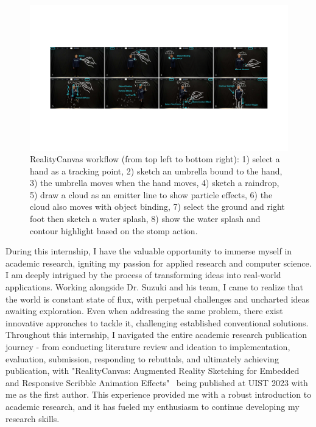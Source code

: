 \documentclass{article}
\def\system{RealityCanvas}
\begin{document}
\begin{figure}[h!]
  \centering
  \includegraphics[width=\textwidth]{figures/teaser-num.pdf}
  \caption{\system{} workflow (from top left to bottom right): 1) select a hand as a tracking point, 2) sketch an umbrella bound to the hand, 3) the umbrella moves when the hand moves, 4) sketch a raindrop, 5) draw a cloud as an emitter line to show particle effects, 6) the cloud also moves with object binding, 7) select the ground and right foot then sketch a water splash, 8) show the water splash and contour highlight based on the stomp action.}
  \label{fig:teaser}
\end{figure}



During this internship, I have the valuable opportunity to immerse myself in academic research, igniting my passion for 
applied research and computer science. I am deeply intrigued by the process of transforming ideas into real-world applications.
Working alongside Dr. Suzuki and his team, I came to realize that the world is constant state of flux, with perpetual challenges 
and uncharted ideas awaiting exploration. Even when addressing the same problem, there exist innovative approaches to tackle it, 
challenging established conventional solutions. Throughout this internship, I navigated the entire academic research publication 
journey - from conducting literature review and ideation to implementation, evaluation, submission, responding to rebuttals, and
ultimately achieving publication, with "RealityCanvas: Augmented Reality Sketching for Embedded and Responsive Scribble Animation Effects"~\cite{xia2023realitycanvas} 
being published at UIST 2023 with me as the first author. This experience provided me with a robust introduction to academic research, 
and it has fueled my enthusiasm to continue developing my research skills.
\end{document}
